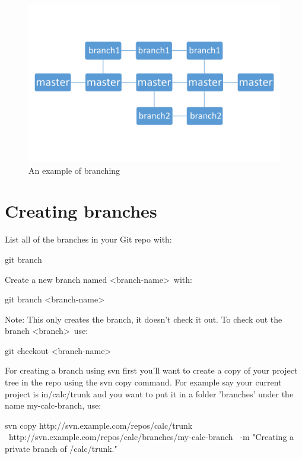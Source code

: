 \documentclass[oneside]{book}
\begin{document}
\begin{figure}[ht!]
    \centering
	\includegraphics[width=120mm]{branching.png}
	\caption{An example of branching} 
\end{figure}

\section{Creating branches}
List all of the branches in your Git repo with:
    \begin{gitcode}
    git branch
    \end{gitcode}
Create a new branch named \textless branch-name\textgreater\ with:
    \begin{gitcode}
    git branch <branch-name>
    \end{gitcode}
Note: This only creates the branch, it doesn't check it out. To check out the branch \textless branch\textgreater\ use:
    \begin{gitcode}
    git checkout <branch-name>
    \end{gitcode}

For creating a branch using svn first you'll want to create a copy of your project tree in the repo using the svn copy command. For example say your current project is in/calc/trunk and you want to put it in a folder 'branches' under the name my-calc-branch, use:
    \begin{svncode}
    svn copy http://svn.example.com/repos/calc/trunk \
    http://svn.example.com/repos/calc/branches/my-calc-branch \
    -m "Creating a private branch of /calc/trunk."
    \end{svncode}
\end{document}
